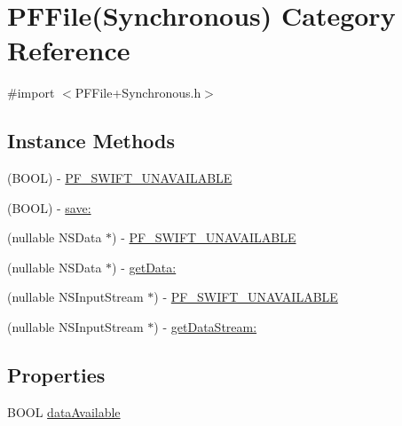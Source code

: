 \hypertarget{category_p_f_file_07_synchronous_08}{}\section{P\+F\+File(Synchronous) Category Reference}
\label{category_p_f_file_07_synchronous_08}


{\ttfamily \#import $<$P\+F\+File+\+Synchronous.\+h$>$}

\subsection*{Instance Methods}
\begin{DoxyCompactItemize}
\item 
(B\+O\+O\+L) -\/ \hyperlink{category_p_f_file_07_synchronous_08_a90a09075c267b8640a6eb1babab5fb7a}{P\+F\+\_\+\+S\+W\+I\+F\+T\+\_\+\+U\+N\+A\+V\+A\+I\+L\+A\+B\+L\+E}
\begin{DoxyCompactList}\small\item\em 

 \end{DoxyCompactList}\item 
(B\+O\+O\+L) -\/ \hyperlink{category_p_f_file_07_synchronous_08_afee8cdeae2851aaebbe594020a5dd949}{save\+:}
\item 
(nullable N\+S\+Data $\ast$) -\/ \hyperlink{category_p_f_file_07_synchronous_08_a9d978a0459e46f7e222acb5c1b51aadc}{P\+F\+\_\+\+S\+W\+I\+F\+T\+\_\+\+U\+N\+A\+V\+A\+I\+L\+A\+B\+L\+E}
\item 
(nullable N\+S\+Data $\ast$) -\/ \hyperlink{category_p_f_file_07_synchronous_08_a26da7ff9282b86024a4e358fe2489c6d}{get\+Data\+:}
\item 
(nullable N\+S\+Input\+Stream $\ast$) -\/ \hyperlink{category_p_f_file_07_synchronous_08_a5cdd02be0cf64455772f9b029babb55e}{P\+F\+\_\+\+S\+W\+I\+F\+T\+\_\+\+U\+N\+A\+V\+A\+I\+L\+A\+B\+L\+E}
\item 
(nullable N\+S\+Input\+Stream $\ast$) -\/ \hyperlink{category_p_f_file_07_synchronous_08_ac09f2a8585972f12be2f80d9d00dc0c5}{get\+Data\+Stream\+:}
\end{DoxyCompactItemize}
\subsection*{Properties}
\begin{DoxyCompactItemize}
\item 
B\+O\+O\+L \hyperlink{category_p_f_file_07_synchronous_08_aa67b26133772a9317623828eb5f4d349}{data\+Available}
\begin{DoxyCompactList}\small\item\em 

 \end{DoxyCompactList}\end{DoxyCompactItemize}


